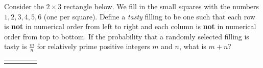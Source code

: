 Consider the $2\times3$ rectangle below. We fill in the small squares with the numbers $1,2,3,4,5,6$ (one per square). Define a \emph{tasty} filling to be one such that each row is \textbf{not} in numerical order from left to right and each column is \textbf{not} in numerical order from top to bottom. If the probability that a randomly selected filling is tasty is $\frac{m}{n}$ for relatively prime positive integers $m$ and $n$, what is $m+n$?
\begin{center}
    \begin{tabular}{|c|c|c|c|}
    \hline
          &   &  \\ \hline
          &   &  \\ \hline
    \end{tabular}
\end{center}